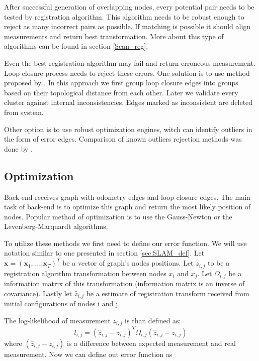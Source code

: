 After successful generation of overlapping nodes, every potential pair needs to be tested by registration algorithm. This algorithm needs to be robust enough to reject as many incorrect pairs as possible. If matching is possible it should align measurements and return best transformation. More about this type of algorithms can be found in section \ref{Scan_reg}.

Even the best registration algorithm may fail and return erroneous measurement. Loop closure process needs to reject these errors. One solution is to use method proposed by \cite{Olson2009Loop}. In this approach we first group loop closure edges into groups based on their topological distance from each other. Later we validate every cluster against internal inconsistencies. Edges marked as inconsistent are deleted from system. 

Other option is to use robust optimization engines, witch can identify outliers in the form of error edges. Comparison of known outliers rejection methods was done by \cite{RobustOpt}. 



\subsection{Optimization}
Back-end receives graph with odometry edges and loop closure edges. The main task of back-end is to optimize this graph and return the most likely position of nodes. Popular method of optimization is to use the Gauss-Newton or the Levenberg-Marquardt algorithms. 

To utilize these methods we first need to define our error function. We will use notation similar to one presented in section \ref{sec:SLAM_def}. Let $\textbf{x} = (\textbf{x}_{1},...,\textbf{x}_{T})^{T} $ be a vector of graph's nodes positions. Let $z_{i,j}$ to be a registration algorithm transformation between nodes $x_{i}$ and $x_{j}$. Let $\Omega_{i,j}$ be a information matrix of this transformation (information matrix is an inverse of covariance). Lastly let $\hat{z}_{i,j}$ be a estimate of registration transform received from initial configurations of nodes i and j.

The log-likelihood of measurement $z_{i,j}$ is than defined as:
\begin{equation}
l_{i,j} = (\hat{z}_{i,j} - z_{i,j})^{T} \Omega_{i,j} (\hat{z}_{i,j} - z_{i,j}) 
\end{equation}  
where $(\hat{z}_{i,j} - z_{i,j})$ is a difference between expected measurement and real measurement. Now we can define out error function as


